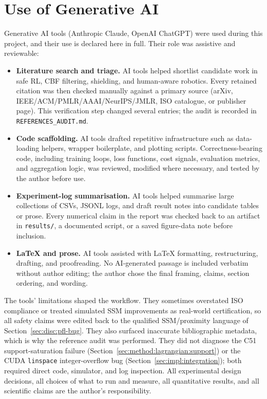 \documentclass[11pt,a4paper]{report}
\newcommand{\ssm}{SSM}
\begin{document}
\chapter{Use of Generative AI}
\label{app:genai}

Generative AI tools (Anthropic Claude, OpenAI ChatGPT) were used during
this project, and their use is declared here in full. Their role was
assistive and reviewable:
\begin{itemize}[topsep=2pt,itemsep=1pt]
\item \textbf{Literature search and triage.} AI tools helped shortlist
  candidate work in safe RL, CBF filtering, shielding, and human-aware
  robotics. Every retained citation was then checked manually against a
  primary source (arXiv, IEEE/ACM/PMLR/AAAI/NeurIPS/JMLR, ISO
  catalogue, or publisher page). This verification step changed several
  entries; the audit is recorded in \texttt{REFERENCES\_AUDIT.md}.
\item \textbf{Code scaffolding.} AI tools drafted repetitive
  infrastructure such as data-loading helpers, wrapper boilerplate, and
  plotting scripts. Correctness-bearing code, including training loops,
  loss functions, cost signals, evaluation metrics, and aggregation
  logic, was reviewed, modified where necessary, and tested by the
  author before use.
\item \textbf{Experiment-log summarisation.} AI tools helped summarise
  large collections of CSVs, JSONL logs, and draft result notes into
  candidate tables or prose. Every numerical claim in the report was
  checked back to an artifact in \texttt{results/}, a documented script,
  or a saved figure-data note before inclusion.
\item \textbf{\LaTeX{} and prose.} AI tools assisted with \LaTeX{}
  formatting, restructuring, drafting, and proofreading. No AI-generated
  passage is included verbatim without author editing; the author chose
  the final framing, claims, section ordering, and wording.
\end{itemize}

The tools' limitations shaped the workflow. They sometimes overstated
ISO compliance or treated simulated \ssm{} improvements as real-world
certification, so all safety claims were edited back to the qualified
\ssm{}/proximity language of Section~\ref{sec:disc:pfl-bug}. They also
surfaced inaccurate bibliographic metadata, which is why the reference
audit was performed. They did not diagnose the C51 support-saturation
failure (Section~\ref{sec:method:lagrangian:support}) or the CUDA
\texttt{linspace} integer-overflow bug
(Section~\ref{sec:impl:integration}); both required direct code,
simulator, and log inspection. All experimental design decisions, all
choices of what to run and measure, all quantitative results, and all
scientific claims are the author's responsibility.
\end{document}
